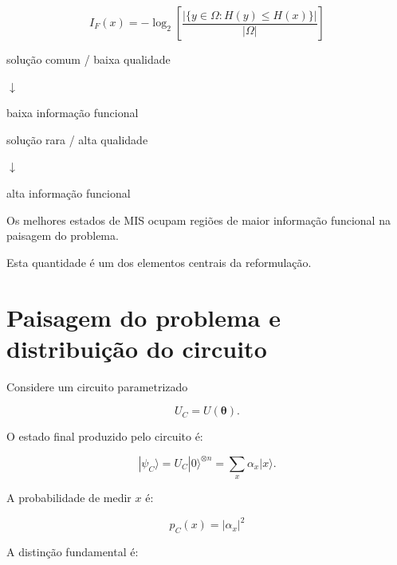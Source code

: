 \documentclass[11pt,a4paper]{article}
\begin{document}
\begin{definitionbox}

\[
\boxed{
I_F(x)
=
-\log_2
\left[
\frac{
|\{y\in\Omega:H(y)\leq H(x)\}|
}{
|\Omega|
}
\right]
}
\]

\begin{center}

\small

solução comum / baixa qualidade

$\downarrow$

baixa informação funcional

\bigskip

solução rara / alta qualidade

$\downarrow$

alta informação funcional

\end{center}

\end{definitionbox}

Os melhores estados de MIS ocupam regiões de maior informação
funcional na paisagem do problema.

Esta quantidade é um dos elementos centrais da reformulação.

\section{Paisagem do problema e distribuição do circuito}

Considere um circuito parametrizado

\[
U_C=U(\boldsymbol\theta).
\]

O estado final produzido pelo circuito é:

\[
|\psi_C\rangle
=
U_C|0\rangle^{\otimes n}
=
\sum_x \alpha_x|x\rangle.
\]

A probabilidade de medir $x$ é:

\[
\boxed{
p_C(x)=|\alpha_x|^2
}
\]

A distinção fundamental é:
\end{document}
